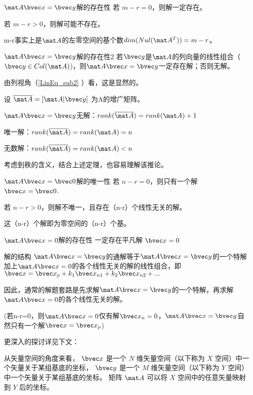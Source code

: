 \begin{theorem}{$\mat A \bvec x=\bvec y$解的存在性}
若 $m-r=0$，则解一定存在。

若 $m-r>0$，则解可能不存在。
\end{theorem}
m-r事实上是$\mat A$的左零空间的基个数$dim(Nul(\mat A^T))=m-r$。

\begin{theorem}{$\mat A \bvec x=\bvec y$解的存在性2}
若$\bvec y$是$\mat A$的列向量的线性组合（$\bvec y \in Col(\mat A)$)，则$\mat A \bvec x=\bvec y$一定存在解；否则无解。
\end{theorem}
由列视角（\autoref{LinEq_sub2} ）看，这是显然的。

\begin{corollary}{}
设 $\overline{\mat A} = [\mat A | \bvec y] $ 为A的增广矩阵。

$\mat A \bvec x=\bvec y$无解：$rank(\overline{\mat A})=rank(\mat A)+1$

唯一解：$rank(\overline{\mat A})=rank(\mat A)=n$

无数解：$rank(\overline{\mat A})=rank(\mat A)<n$
\end{corollary}
考虑到秩的含义，结合上述定理，也容易理解该推论。

\begin{theorem}{$\mat A \bvec x=\bvec 0$解的唯一性}
若 $n-r=0$，则只有一个解 $\bvec x = \bvec 0$.

若 $n-r>0$，则解不唯一，且存在（n-r）个线性无关的解。
\end{theorem}
这（n-r）个解即为零空间的（n-r）个基。

\begin{theorem}{$\mat A \bvec x=0$解的存在性}
一定存在平凡解 $\bvec x=0$
\end{theorem}

\begin{theorem}{解的结构}
$\mat A \bvec x=\bvec y$的通解等于$\mat A \bvec x=\bvec y$的一个特解加上$\mat A \bvec x=0$的各个线性无关的解的线性组合，即$\bvec x = \bvec x_p +k_1\bvec x_{n1}+k_2\bvec x_{n2}+...$

因此，通常的解题套路是先求解$\mat A \bvec x=\bvec y$的一个特解，再求解$\mat A \bvec x=0$的各个线性无关的解。

(若n-r=0，则$\mat A \bvec x=0$仅有解$\bvec x_n=0$，$\mat A \bvec x=\bvec y$自然只有一个解$\bvec x = \bvec x_p$)
\end{theorem}

更深入的探讨详见下文：

从矢量空间的角度来看， $\bvec x$ 是一个 $N$ 维矢量空间（以下称为 $X$ 空间）中一个矢量关于某组基底的坐标， $\bvec y$ 是一个 $M$ 维矢量空间（以下称为 $Y$ 空间）中一个矢量关于某组基底的坐标。 矩阵 $\mat A$ 可以将 $X$ 空间中的任意矢量映射到 $Y$ 后的坐标。

